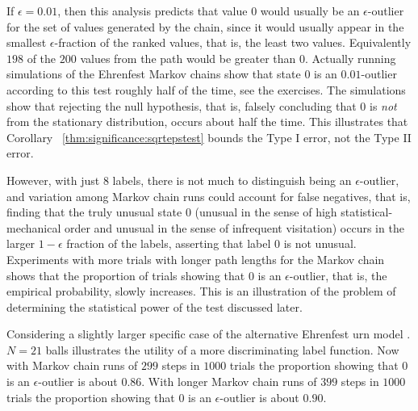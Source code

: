\documentclass[12pt]{article}
\begin{document}
\begin{example}
    If \( \epsilon = 0.01 \), then this analysis predicts that value \(
    0 \) would usually be an \( \epsilon \)-outlier for the set of
    values generated by the chain, since it would usually appear in the
    smallest \( \epsilon \)-fraction of the ranked values, that is, the
    least two values.  Equivalently \( 198 \) of the \( 200 \) values
    from the path would be greater than \( 0 \).  Actually running
    simulations of the Ehrenfest Markov chains show that state \( 0 \)
    is an \( 0.01 \)-outlier according to this test roughly half of the
    time, see the exercises.  The simulations show that rejecting the
    null hypothesis, that is, falsely concluding that \( 0 \) is \emph{not}
    from the stationary distribution, occurs about half the time.  This
    illustrates that Corollary~%
    \ref{thm:significance:sqrtepstest} bounds the Type I error, not the
    Type II error.

    However, with just \( 8 \) labels, there is not much to distinguish
    being an \( \epsilon \)-outlier, and variation among Markov chain
    runs could account for false negatives, that is, finding that the
    truly unusual state \( 0 \) (unusual in the sense of high
    statistical-mechanical order and unusual in the sense of
    infrequent visitation) occurs in the larger \( 1 - \epsilon \)
    fraction of the labels, asserting that label \( 0 \) is not unusual.
    Experiments with more trials with longer path lengths for the Markov
    chain shows that the proportion of trials showing that \( 0 \) is an
    \( \epsilon \)-outlier, that is, the empirical probability, slowly
    increases.  This is an illustration of the problem of determining
    the statistical power of the test discussed later.

    Considering a slightly larger specific case of the alternative
    Ehrenfest urn model%
.    \( N = 21 \) balls illustrates the utility of a more discriminating
    label function.  Now with Markov chain runs of \( 299 \) steps in \(
    1000 \) trials the proportion showing that \( 0 \) is an \( \epsilon
    \)-outlier is about \( 0.86 \).  With longer Markov chain runs of \(
    399 \) steps in \( 1000 \) trials the proportion showing that \( 0 \)
    is an \( \epsilon \)-outlier is about \( 0.90 \).


\end{example}
\end{document}
